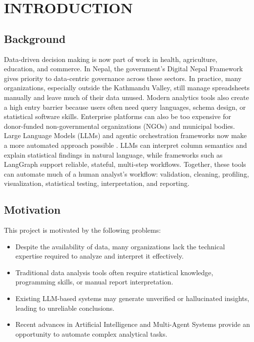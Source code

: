 \documentclass[12pt,a4paper,openany]{report}
\begin{document}
\clearpage
{}

\chapter{INTRODUCTION}

\section{Background}

Data-driven decision making is now part of work in health, agriculture, education, and commerce. In Nepal, the government's Digital Nepal Framework gives priority to data-centric governance across these sectors. In practice, many organizations, especially outside the Kathmandu Valley, still manage spreadsheets manually and leave much of their data unused. Modern analytics tools also create a high entry barrier because users often need query languages, schema design, or statistical software skills. Enterprise platforms can also be too expensive for donor-funded non-governmental organizations (NGOs) and municipal bodies. Large Language Models (LLMs) and agentic orchestration frameworks now make a more automated approach possible \cite{dwivedi2023}. LLMs can interpret column semantics and explain statistical findings in natural language, while frameworks such as LangGraph support reliable, stateful, multi-step workflows. Together, these tools can automate much of a human analyst's workflow: validation, cleaning, profiling, visualization, statistical testing, interpretation, and reporting.

\section{Motivation}

This project is motivated by the following problems:

\begin{itemize}
	\item Despite the availability of data, many organizations lack the technical expertise required to analyze and interpret it effectively.
	\item Traditional data analysis tools often require statistical knowledge, programming skills, or manual report interpretation.
	\item Existing LLM-based systems may generate unverified or hallucinated insights, leading to unreliable conclusions.
	\item Recent advances in Artificial Intelligence and Multi-Agent Systems provide an opportunity to automate complex analytical tasks.
\end{itemize}
\end{document}
